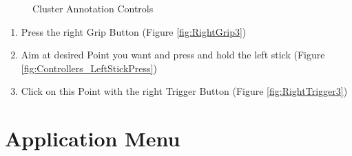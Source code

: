 \documentclass[notitlepage]{article}
\begin{document}
\begin{figure}[H]
   \centering
    \quad
    \quad
    \caption{Cluster Annotation Controls}\label{fig:UI-Interaction}%
\end{figure}

\qquad
\begin{enumerate}
\item Press the right Grip Button (Figure \ref{fig:RightGrip3}) \\
\item Aim at desired Point you want and press and hold the left stick (Figure \ref{fig:Controllers_LeftStickPress})\\
\item Click on this Point with the right Trigger Button (Figure \ref{fig:RightTrigger3})
\end{enumerate}  

\section{Application Menu}
\end{document}
